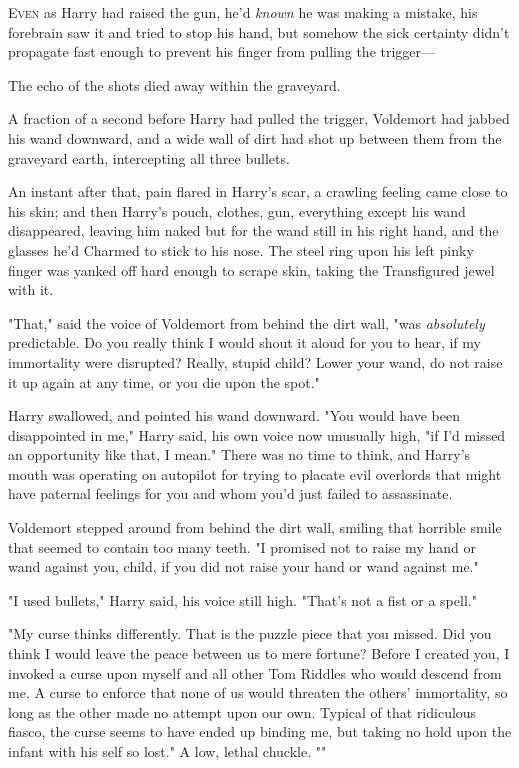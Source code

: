 
\lettrine{E}{ven} as Harry had
raised the gun, he'd \emph{known} he was making a mistake, his forebrain saw it
and tried to stop his hand, but somehow the sick certainty didn't propagate
fast enough to prevent his finger from pulling the trigger—

The echo of the shots died away within the graveyard.

A fraction of a second before Harry had pulled the trigger, Voldemort had
jabbed his wand downward, and a wide wall of dirt had shot up between them from
the graveyard earth, intercepting all three bullets.

An instant after that, pain flared in Harry's scar, a crawling feeling came
close to his skin; and then Harry's pouch, clothes, gun, everything except his
wand disappeared, leaving him naked but for the wand still in his right hand,
and the glasses he'd Charmed to stick to his nose. The steel ring upon his left
pinky finger was yanked off hard enough to scrape skin, taking the Transfigured
jewel with it.

"That," said the voice of Voldemort from behind the dirt wall, "was
\emph{absolutely} predictable. Do you really think I would shout it aloud for
you to hear, if my immortality were disrupted? Really, stupid child? Lower your
wand, do not raise it up again at any time, or you die upon the spot."

Harry swallowed, and pointed his wand downward. "You would have been
disappointed in me," Harry said, his own voice now unusually high, "if I'd
missed an opportunity like that, I mean." There was no time to think, and
Harry's mouth was operating on autopilot for trying to placate evil overlords
that might have paternal feelings for you and whom you'd just failed to
assassinate.

Voldemort stepped around from behind the dirt wall, smiling that horrible smile
that seemed to contain too many teeth. "I promised not to raise my hand or wand
against you, child, if you did not raise your hand or wand against me."

"I used bullets," Harry said, his voice still high. "That's not a fist or a
spell."

"My curse thinks differently. That is the puzzle piece that you missed. Did you
think I would leave the peace between us to mere fortune? Before I created you,
I invoked a curse upon myself and all other Tom Riddles who would descend from
me. A curse to enforce that none of us would threaten the others' immortality,
so long as the other made no attempt upon our own. Typical of that ridiculous
fiasco, the curse seems to have ended up binding me, but taking no hold upon
the infant with his self so lost." A low, lethal chuckle. ""

